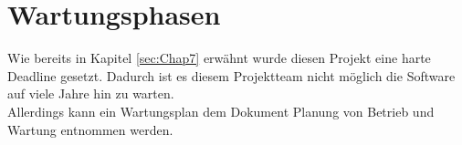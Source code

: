 \chapter{Wartungsphasen}

Wie bereits in Kapitel \ref{sec:Chap7} erwähnt wurde diesen Projekt eine harte Deadline gesetzt. Dadurch ist es diesem Projektteam nicht möglich die Software auf viele Jahre hin zu warten. \\
Allerdings kann ein Wartungsplan dem Dokument \glqq Planung von Betrieb und Wartung\grqq \: entnommen werden.

